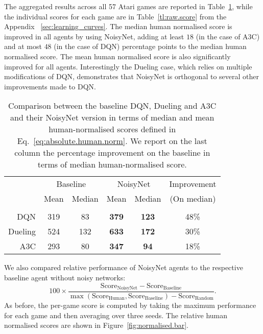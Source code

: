 \documentclass{article}
\newcommand{\algoinit}{NoisyNet}
\begin{document}
The aggregated results across all 57 Atari games are reported in Table~\ref{tab:totalhuman}, while the individual scores for each game are in Table~\ref{tl:raw.score} from the Appendix~ \ref{sec:learning_curves}.
The median human normalised score is improved in all agents by using \algoinit{}, adding at least $18$ (in the case of A3C) and at most $48$ (in the case of DQN)  percentage points to the median human normalised score.
The mean human normalised score is also significantly improved for all agents.
Interestingly the Dueling case, which relies on multiple modifications of DQN, demonstrates that \algoinit{} is orthogonal to several other improvements made to DQN.
\begin{table}[ht!]
\centering
\begin{tabular}{rccccc}
\toprule
 & \multicolumn{2}{c}{Baseline} & \multicolumn{2}{c}{\algoinit{}}&Improvement \\
 & Mean & Median & Mean & Median& (On median) \\
 \hline
 \\
DQN & 319 & 83 & \textbf{379} & \textbf{123} & 48\%\\ 
Dueling & 524 & 132 & \textbf{633} & \textbf{172} & 30\% \\
A3C & 293 & 80 & \textbf{347} & \textbf{94} &  18\%\\
\bottomrule
\end{tabular}
\vspace{1em}
 \caption{Comparison between the baseline DQN, Dueling and A3C  and their \algoinit{} version in terms of median and mean human-normalised scores defined in Eq.~\eqref{eq:absolute.human.norm}. We report on the last column the percentage  improvement on the baseline in terms of median human-normalised score.}\label{tab:totalhuman} 
\end{table}
We also compared relative performance of \algoinit{} agents to the respective baseline agent without noisy networks:
\begin{equation}
\label{eq:relative.human.norm}
100 \times \frac{\text{Score}_{\text{\algoinit{}}}-\text{Score}_{\text{Baseline}}}{\max(\text{Score}_{\text{Human}},\text{Score}_{\text{Baseline}})-\text{Score}_{\text{Random}}}.
\end{equation}
As before, the per-game score is computed by taking the maximum performance for each game and then averaging over three seeds. 
The relative human normalised scores are shown in Figure~\ref{fig:normalised.bar}.
\end{document}
